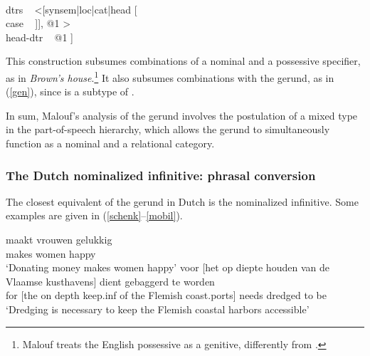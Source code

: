 \documentclass[output=paper]{langsci/langscibook}
\begin{document}
\begin{exe} 
\ex\label{gencx} 
\begin{avm} 
[\type{noun-poss-cx}                                      \\
 synsem|loc [cat|head ~ \type{noun}                       \\
             content ~ \type{nom-obj}]                    \\
 dtrs ~ <[synsem|loc|cat|head [                \\
                               case ~ ]], @1 > \\
 head-dtr ~ @1 ] 
\end{avm}
\end{exe}
 
\noindent
This construction subsumes combinations of a nominal and a 
possessive specifier, as in \emph{Brown's house}.\footnote{Malouf treats 
the English possessive as a genitive, differently from \citet{SagWasow03}.}   
It also subsumes combinations with the gerund, as in (\ref{gen}), since 
 is a subtype of .  

In sum, Malouf's analysis of the gerund involves the postulation of a
mixed type in the part-of-speech hierarchy, which allows the gerund to simultaneously
function as a nominal and a relational category. 


\subsubsection{The Dutch nominalized infinitive: phrasal conversion } 


The closest equivalent of the gerund in Dutch is the nominalized infinitive. 
Some examples are given in (\ref{schenk}--\ref{mobil}). 

\begin{exe} 
\ex\label{schenk} 
 maakt vrouwen gelukkig  \\
       [money donate.{\sc inf}] makes women happy \\
\trans `Donating money makes women happy' 
\ex\label{mobil}   
\gll   voor [het op diepte houden van de Vlaamse kusthavens] dient gebaggerd te worden  \\  
       for [the on depth keep.{\sc inf} of the Flemish coast.ports] needs dredged to be \\
\trans `Dredging is necessary to keep the Flemish coastal harbors accessible'  
\end{exe} 
\end{document}
